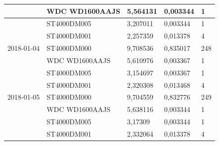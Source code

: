 \documentclass{VUMIFPSkursinis}
\begin{document}
\begin{table}[H]
{\begin{tabular}{|l|l|l|l|l|}
\cellcolor[HTML]{C0C0C0}            & WDC WD1600AAJS                        & 5,564131                               & 0,003344                             & 1                                    \\ \hline
\cellcolor[HTML]{C0C0C0}            & ST4000DM005                           & 3,207011                               & 0,003344                             & 1                                    \\ \hline
\cellcolor[HTML]{C0C0C0}            & ST4000DM001                           & 2,257359                               & 0,013378                             & 4                                    \\ \hline
2018-01-04                          & ST4000DM000                           & 9,708536                               & 0,835017                             & 248                                  \\ \hline
\cellcolor[HTML]{C0C0C0}            & WDC WD1600AAJS                        & 5,610976                               & 0,003367                             & 1                                    \\ \hline
\cellcolor[HTML]{C0C0C0}            & ST4000DM005                           & 3,154697                               & 0,003367                             & 1                                    \\ \hline
\cellcolor[HTML]{C0C0C0}            & ST4000DM001                           & 2,320308                               & 0,013468                             & 4                                    \\ \hline
2018-01-05                          & ST4000DM000                           & 9,704559                               & 0,832776                             & 249                                  \\ \hline
\cellcolor[HTML]{C0C0C0}            & WDC WD1600AAJS                        & 5,638116                               & 0,003344                             & 1                                    \\ \hline
\cellcolor[HTML]{C0C0C0}            & ST4000DM005                           & 3,17309                                & 0,003344                             & 1                                    \\ \hline
\cellcolor[HTML]{C0C0C0}            & ST4000DM001                           & 2,332064                               & 0,013378                             & 4                                    \\ \hline

\end{tabular}}
\end{table}
\end{document}
